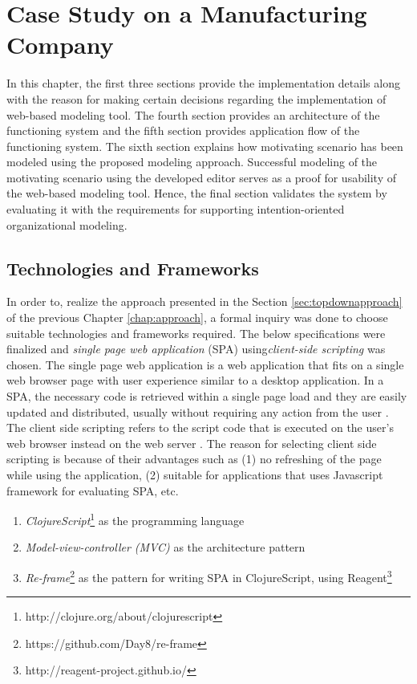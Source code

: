 \chapter{Case Study on a Manufacturing Company}
\label{chap:casestudy}

In this chapter, the first three sections provide the implementation details along with the reason for making certain decisions regarding the implementation of web-based modeling tool. The fourth section provides an architecture of the functioning system and the fifth section provides application flow of the functioning system. The sixth section explains how motivating scenario has been modeled using the proposed modeling approach. Successful modeling of the motivating scenario using the developed editor serves as a proof for usability of the web-based modeling tool. Hence, the final section validates the system by evaluating it with the requirements for supporting intention-oriented organizational modeling. 

\section{Technologies and Frameworks}
\label{subsec:specifications}
In order to, realize the approach presented in the Section \ref{sec:topdownapproach} of the previous Chapter \ref{chap:approach}, a formal inquiry was done to choose suitable technologies and frameworks required. The below specifications were finalized and \textit{single page web application} (SPA) using\textit{client-side scripting} was chosen. The single page web application is a web application that fits on a single web browser page with user experience similar to a desktop application. In a SPA, the necessary code is retrieved within a single page load and they are easily updated and distributed, usually without requiring any action from the user \cite{Mikowski2013}. The client side scripting refers to the script code that is executed on the user's web browser instead on the web server \cite{Sierra2012}. The reason for selecting client side scripting is because of their advantages such as (1) no refreshing of the page while using the application, (2) suitable for applications that uses Javascript framework for evaluating SPA, etc. 

\begin{enumerate}   
	\item \textit{ClojureScript}\footnote{http://clojure.org/about/clojurescript} as the programming language
	\item \textit{Model-view-controller (MVC)} \cite{Deacon2009}  as the architecture pattern
	\item \textit{Re-frame}\footnote{https://github.com/Day8/re-frame} as the pattern for writing SPA in ClojureScript, using Reagent\footnote{http://reagent-project.github.io/}	
\end{enumerate}

